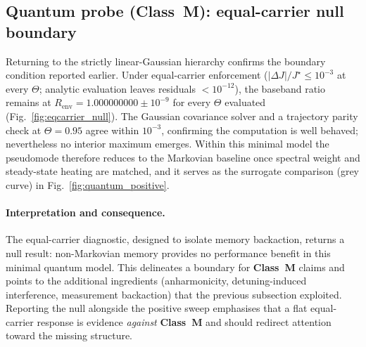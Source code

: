 \documentclass[11pt,letterpaper]{article}
\DeclareRobustCommand{\classM}{\textbf{Class~M}\xspace}
\begin{document}
\subsection{Quantum probe (\classM): equal-carrier null boundary}
\label{sec:results_quantum}
Returning to the strictly linear-Gaussian hierarchy confirms the boundary condition reported earlier. Under equal-carrier enforcement ($|\Delta J|/J^\star \le 10^{-3}$ at every $\Theta$; analytic evaluation leaves residuals $<10^{-12}$), the baseband ratio remains at $R_{\mathrm{env}} = 1.000000000\pm 10^{-9}$ for every $\Theta$ evaluated (Fig.~\ref{fig:eqcarrier_null}). The Gaussian covariance solver and a trajectory parity check at $\Theta=0.95$ agree within $10^{-3}$, confirming the computation is well behaved; nevertheless no interior maximum emerges. Within this minimal model the pseudomode therefore reduces to the Markovian baseline once spectral weight and steady-state heating are matched, and it serves as the surrogate comparison (grey curve) in Fig.~\ref{fig:quantum_positive}.

\paragraph*{Interpretation and consequence.} The equal-carrier diagnostic, designed to isolate memory backaction, returns a null result: non-Markovian memory provides no performance benefit in this minimal quantum model. This delineates a boundary for \classM{} claims and points to the additional ingredients (anharmonicity, detuning-induced interference, measurement backaction) that the previous subsection exploited. Reporting the null alongside the positive sweep emphasises that a flat equal-carrier response is evidence \emph{against} \classM{} and should redirect attention toward the missing structure.
\end{document}
